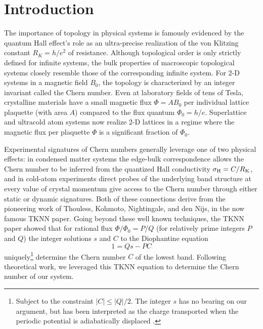 \section{Introduction}
	The importance of topology in physical systems is famously evidenced by the quantum Hall effect's role as an ultra-precise realization of the von Klitzing constant $R_K = h/e^2$ of resistance\cite{Klitzing1980}. Although topological order is only strictly defined for infinite systems, the bulk properties of macroscopic topological systems closely resemble those of the corresponding infinite system. For 2-D systems in a magnetic field $B_0$, the topology is characterized by an integer invariant called the Chern number. Even at laboratory fields of tens of Tesla, crystalline materials have a small magnetic flux $\Phi=AB_0$ per individual lattice plaquette (with area $A$) compared to the flux quantum $\Phi_0=h/e$. Superlattice \cite{Geisler2004,Melinte2004,Feil2007,Dean2013} and ultracold atom\cite{Miyake2013,Aidelsburger2013,Jotzu2014,An2017} systems now realize 2-D lattices in a regime where the magnetic flux per plaquette $\Phi$ is a significant fraction of $\Phi_0$. %

	Experimental signatures of Chern numbers generally leverage one of two physical effects: in condensed matter systems the edge-bulk correspondence allows the Chern number to be inferred from the quantized Hall conductivity $\sigma_{\rm{H}} = C/R_{\rm{K}}$, and in cold-atom experiments direct probes of the underlying band structure at every value of crystal momentum give access to the Chern number through either static \cite{Aidelsburger2015,Wang2013} or dynamic \cite{Song2018,Tarnowski2018,Sun2018,Asteria2018} signatures.  Both of these connections derive from the pioneering work of  Thouless, Kohmoto, Nightingale, and den Nijs\cite{Thouless1982}, in the now famous TKNN paper.  Going beyond these well known techniques, the TKNN paper showed that for rational flux $\Phi/\Phi_0 = P/Q$ (for relatively prime integers $P$ and $Q$) the integer solutions  $s$ and $C$ to the Diophantine equation 
\begin{equation}
1 = Q s - P C
\label{eqn:Diophantine}
\end{equation}  
uniquely\footnote{Subject to the constraint $|C|\leq |Q|/2$\cite{Thouless1982, Kohmoto1989}. The integer $s$ has no bearing on our argument, but has been interpreted as the charge transported when the periodic potential is adiabatically displaced \cite{MacDonald1984,Kunz1986}.} determine the Chern number $C$ of the lowest band. Following theoretical work\cite{Huang2013,Liu2013,Wang2013,Zhang2016,Mugel2017}, we leveraged this TKNN equation to determine the Chern number of our system.
		
